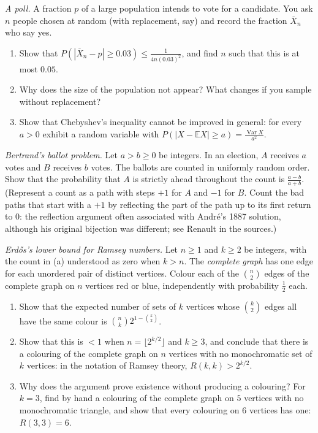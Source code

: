 \begin{exercise}[$\star\star$]\label{ex:poll}
\emph{A poll.} A fraction $p$ of a large population intends to vote for a candidate. You ask $n$ people chosen at random (with replacement, say) and record the fraction $\overline X_n$ who say yes.
\begin{enumerate}[label=(\alph*)]
\item Show that $P(|\overline X_n-p|\ge0.03)\le\frac1{4n(0.03)^2}$, and find $n$ such that this is at most $0.05$.
\item Why does the size of the population not appear? What changes if you sample without replacement?
\item Show that Chebyshev's inequality cannot be improved in general: for every $a>0$ exhibit a random variable with $P(|X-\mathbb EX|\ge a)=\frac{\operatorname{Var}X}{a^2}$.
\end{enumerate}
\end{exercise}

\begin{exercise}[$\star\star\star$]\label{ex:ballot}
\emph{Bertrand's ballot problem.} Let $a>b\ge0$ be integers. In an election, $A$ receives $a$ votes and $B$ receives $b$ votes. The ballots are counted in uniformly random order. Show that the probability that $A$ is strictly ahead throughout the count is $\frac{a-b}{a+b}$. (Represent a count as a path with steps $+1$ for $A$ and $-1$ for $B$. Count the bad paths that start with a $+1$ by reflecting the part of the path up to its first return to $0$: the reflection argument often associated with Andr\'e's 1887 solution, although his original bijection was different; see Renault in the sources.)
\end{exercise}

\begin{exercise}[$\star\star\star$]\label{ex:ramsey}
\emph{Erd\H os's lower bound for Ramsey numbers.} Let $n\ge1$ and $k\ge2$ be integers, with the count in (a) understood as zero when $k>n$. The \emph{complete graph} has one edge for each unordered pair of distinct vertices. Colour each of the $\binom n2$ edges of the complete graph on $n$ vertices red or blue, independently with probability $\frac12$ each.
\begin{enumerate}[label=(\alph*)]
\item Show that the expected number of sets of $k$ vertices whose $\binom k2$ edges all have the same colour is $\binom nk2^{1-\binom k2}$.
\item Show that this is $<1$ when $n=\lfloor2^{k/2}\rfloor$ and $k\ge3$, and conclude that there is a colouring of the complete graph on $n$ vertices with no monochromatic set of $k$ vertices: in the notation of Ramsey theory, $R(k,k)>2^{k/2}$.
\item Why does the argument prove existence without producing a colouring? For $k=3$, find by hand a colouring of the complete graph on $5$ vertices with no monochromatic triangle, and show that every colouring on $6$ vertices has one: $R(3,3)=6$.
\end{enumerate}
\end{exercise}

